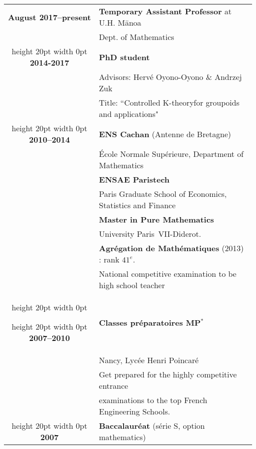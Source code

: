 \documentclass[a4paper,11pt]{article}
\newcommand\espace{\vrule height 20pt width 0pt}
\begin{document}
\begin{tabular}{cp{}}

\textbf{August 2017--present} &  \textbf{Temporary Assistant Professor} at U.H. M\={a}noa  \\
						& Dept. of Mathematics\\
\espace
\textbf{2014-2017} &  \textbf{PhD student}  \\
						& Advisors: Hervé Oyono-Oyono \& Andrzej Zuk \\
						& Title: ``Controlled K-theoryfor groupoids and applications" \\
\espace
\textbf{2010--2014} &  \textbf{ENS Cachan} (Antenne de Bretagne) \\
				    & \'Ecole Normale Supérieure, Department of Mathematics \\
                              & \textbf{ENSAE Paristech}\\
				&	Paris Graduate School of Economics, Statistics and Finance\\
                                   & \textbf{Master in Pure Mathematics}\\  & University Paris~VII-Diderot. \\
                                   & \textbf{Agrégation de Mathématiques} (2013) : rank $41^e$. \\
				& National competitive examination to be high school teacher\\
\espace

\espace
\textbf{2007--2010} &\textbf{Classes préparatoires MP$^*$ } \\
					& Nancy, Lycée Henri Poincaré\\
					& Get prepared for the highly competitive entrance \\
				& examinations to the top French Engineering Schools.\\

\espace
\textbf{2007} & \textbf{Baccalauréat} (série S, option mathematics) 
 \\

\end{tabular}
\end{document}
